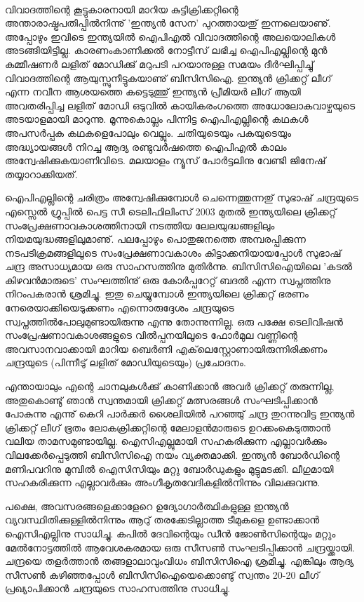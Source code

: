 ﻿
\enlargethispage{2\baselineskip}
\vskip 4pt

‌\hspace*{3em}\parbox{8.5cm}{
\small
വിവാദത്തിന്റെ കൂട്ടുകാരനായി മാറിയ കുട്ടിക്രിക്കറ്റിന്റെ അന്താരാഷ്ട്രപതിപ്പില്‍നിന്നു് 'ഇന്ത്യന്‍ സേന' പുറത്തായതു് 
ഇന്നലെയാണു്. അപ്പോഴും ഇവിടെ ഇന്ത്യയില്‍ ഐപിഎല്‍ വിവാദത്തിന്റെ അലയൊലികള്‍ അടങ്ങിയിട്ടില്ല. 
കാരണംകാണിക്കല്‍ നോട്ടീസ് ലഭിച്ച ഐപിഎല്ലിന്റെ മുന്‍ കമ്മീഷണര്‍ ലളിത് മോഡിക്കു് മറുപടി പറയാനുള്ള 
സമയം ദീര്‍ഘിപ്പിച്ചു് വിവാദത്തിന്റെ ആയുസ്സുനീട്ടുകയാണു് ബിസിസിഐ. ഇന്ത്യന്‍ ക്രിക്കറ്റ് ലീഗ് എന്ന നവീന 
ആശയത്തെ കട്ടെടുത്തു് ഇന്ത്യന്‍ പ്രീമിയര്‍ ലീഗ് ആയി അവതരിപ്പിച്ച ലളിത് മോഡി ഒടുവില്‍ കായികരംഗത്തെ 
അധോലോകവാഴ്ചയുടെ അടയാളമായി മാറുന്നു. മൂന്നുകൊല്ലം പിന്നിട്ട ഐപിഎല്ലിന്റെ കഥകള്‍ 
അപസര്‍പ്പക കഥകളെപോലും വെല്ലും. ചതിയുടെയും പകയുടെയും അദ്ധ്യായങ്ങള്‍ നിറച്ച ആദ്യ രണ്ടുവര്‍ഷത്തെ ഐപിഎല്‍ കാലം 
അന്വേഷിക്കുകയാണിവിടെ.  മലയാളം ന്യൂസ് പോര്‍ട്ടലിനു വേണ്ടി ജിനേഷ് തയ്യാറാക്കിയത്.
}

\vskip 14pt

\hspace*{-1.5em}ഐപിഎല്ലിന്റെ ചരിത്രം അന്വേഷിക്കുമ്പോള്‍ ചെന്നെത്തുന്നതു് സുഭാഷ് ചന്ദ്രയുടെ എസ്സെല്‍ ഗ്രൂപ്പില്‍ പെട്ട സീ ടെലിഫിലിംസ് 
2003 മുതല്‍ ഇന്ത്യയിലെ ക്രിക്കറ്റ് സംപ്രേക്ഷണാവകാശത്തിനായി നടത്തിയ ലേലയുദ്ധങ്ങളിലും നിയമയുദ്ധങ്ങളിലുമാണു്. 
പലപ്പോഴും പൊതുജനത്തെ അമ്പരപ്പിക്കുന്ന നടപടിക്രമങ്ങളിലൂടെ സംപ്രേക്ഷണാവകാശം കിട്ടാക്കനിയായപ്പോള്‍ 
സുഭാഷ് ചന്ദ്ര അസാധ്യമായ ഒരു സാഹസത്തിനു മുതിര്‍ന്നു. ബിസിസിഐയിലെ 'കടല്‍ കിഴവന്‍മാരുടെ' സംഘത്തിനു് 
ഒരു കോര്‍പ്പറേറ്റ് ബദല്‍ എന്ന സ്വപ്നത്തിനു നിറംപകരാന്‍ ശ്രമിച്ചു. ഇതു ചെയ്യുമ്പോള്‍ ഇന്ത്യയിലെ ക്രിക്കറ്റ് ഭരണം 
നേരെയാക്കിയെടുക്കണം എന്നൊരുദ്ദേശം ചന്ദ്രയുടെ സ്വപ്നത്തില്‍പോലുമുണ്ടായിരുന്നു എന്നു തോന്നുന്നില്ല. ഒരു പക്ഷേ 
ടെലിവിഷന്‍ സംപ്രേഷണാവകാശങ്ങളുടെ വില്‍പ്പനയിലൂടെ ഫോര്‍മുല വണ്ണിന്റെ അവസാനവാക്കായി മാറിയ ബെര്‍ണി 
എക്‌ലെസ്റ്റോണായിരുന്നിരിക്കണം ചന്ദ്രയുടെ (പിന്നീടു് ലളിത് മോഡിയുടെയും) പ്രചോദനം.

എന്തായാലും എന്റെ ചാനലുകള്‍ക്കു് കാണിക്കാന്‍ അവര്‍ ക്രിക്കറ്റ് തരുന്നില്ല, അതുകൊണ്ടു് ഞാന്‍ സ്വന്തമായി 
ക്രിക്കറ്റ് മത്സരങ്ങള്‍ സംഘടിപ്പിക്കാന്‍ പോകുന്നു എന്നു് കെറി പാര്‍ക്കര്‍ ശൈലിയില്‍ പറഞ്ഞു് ചന്ദ്ര തുറന്നുവിട്ട ഇന്ത്യന്‍ 
ക്രിക്കറ്റ് ലീഗ് ഭൂതം ലോകക്രിക്കറ്റിന്റെ മേലാളന്‍മാരുടെ ഉറക്കംകെടുത്താന്‍ വലിയ താമസമുണ്ടായില്ല. ഐസിഎല്ലുമായി 
സഹകരിക്കുന്ന എല്ലാവര്‍ക്കും വിലക്കേര്‍പ്പെടുത്തി ബിസിസിഐ നയം വ്യക്തമാക്കി. ഇന്ത്യന്‍ ബോര്‍ഡിന്റെ മണിപവറിനു 
മുമ്പില്‍ ഐസിസിയും മറ്റു ബോര്‍ഡുകളും മുട്ടുമടക്കി. ലീഗുമായി സഹകരിക്കുന്ന എല്ലാവര്‍ക്കും അംഗീകൃതവേദികളില്‍നിന്നും 
വിലക്കുവന്നു.

പക്ഷെ, അവസരങ്ങളെക്കാളേറെ ഉദ്യോഗാര്‍ത്ഥികളുള്ള ഇന്ത്യന്‍ വ്യവസ്ഥിതിക്കുള്ളില്‍നിന്നും ആറു് തരക്കേടില്ലാത്ത 
ടീമുകളെ ഉണ്ടാക്കാന്‍ ഐസിഎല്ലിനു സാധിച്ചു. കപില്‍ ദേവിന്റെയും ഡീന്‍ ജോണ്‍സിന്റെയും മറ്റും മേല്‍നോട്ടത്തില്‍ 
ആവേശകരമായ ഒരു സീസണ്‍ സംഘടിപ്പിക്കാന്‍ ചന്ദ്രയ്ക്കായി. ചന്ദ്രയെ തളര്‍ത്താന്‍ തങ്ങളാലാവുംവിധം ബിസിസിഐ 
ശ്രമിച്ചു. എങ്കിലും ആദ്യ സീസണ്‍ കഴിഞ്ഞപ്പോള്‍ ബിസിസിഐയെക്കൊണ്ടു് സ്വന്തം 20-20 ലീഗ് പ്രഖ്യാപിക്കാന്‍ ചന്ദ്രയുടെ 
സാഹസത്തിനു സാധിച്ചു.

